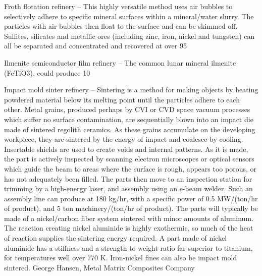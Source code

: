 \documentclass[a4paper]{book}
\begin{document}
Froth flotation refinery – This highly versatile method uses air bubbles to selectively adhere to specific mineral surfaces within a mineral/water slurry.  The particles with air-bubbles then float to the surface and can be skimmed off.  Sulfites, silicates and metallic ores (including zinc, iron, nickel and tungsten) can all be separated and concentrated and recovered at over 95%
 
Ilmenite semiconductor film refinery – The common lunar mineral ilmenite (FeTiO3), could produce 10%
 
Impact mold sinter refinery – Sintering is a method for making objects by heating powdered material below its melting point until the particles adhere to each other. Metal grains, produced perhaps by CVI or CVD space vacuum processes which suffer no surface contamination, are sequentially blown into an impact die made of sintered regolith ceramics. As these grains accumulate on the developing workpiece, they are sintered by the energy of impact and coalesce by cooling. Insertable shields are used to create voids and internal patterns. As it is made, the part is actively inspected by scanning electron microscopes or optical sensors which guide the beam to areas where the surface is rough, appears too porous, or has not adequately been filled. The parts then move to an inspection station for trimming by a high-energy laser, and assembly using an e-beam welder. Such an assembly line can produce at 180 kg/hr, with a specific power of 0.5 MW/(ton/hr of product), and 5 ton machinery/(ton/hr of product).  The parts will typically be made of a nickel/carbon fiber system sintered with minor amounts of aluminum. The reaction creating nickel aluminide is highly exothermic, so much of the heat of reaction supplies the sintering energy required. A part made of nickel aluminide has a stiffness and a strength to weight ratio far superior to titanium, for temperatures well over 770 K.  Iron-nickel fines can also be impact mold sintered. George Hansen, Metal Matrix Composites Company
 
\end{document}
